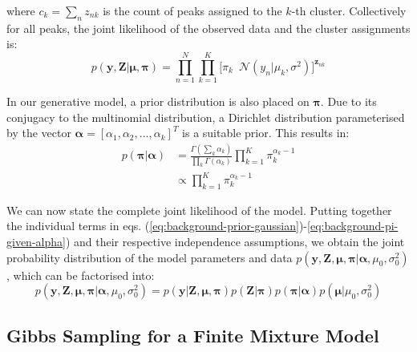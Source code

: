 where $c_{k} = \sum_n z_{nk}$ is the count of peaks assigned to the $k$-th cluster. Collectively for all peaks, the joint likelihood of the observed data and the cluster assignments is:
\begin{equation}
p(\boldsymbol{y},\boldsymbol{Z}  \vert \boldsymbol{\mu},\boldsymbol{\pi}) = \prod_{n=1}^{N} \prod_{k=1}^{K} \big[ \pi_k \enspace \mathcal{N}(y_n \vert \mu_k,\sigma^2) \big]^{\boldsymbol{z}_{nk}}
\label{eq:background-mixture-likelihood}
\end{equation}

In our generative model, a prior distribution is also placed on $\boldsymbol{\pi}$. Due to its conjugacy to the multinomial distribution, a Dirichlet distribution parameterised by the vector $\boldsymbol{\alpha}=[\alpha_1,\alpha_2,...,\alpha_k]^T$ is a suitable prior. This results in:
\begin{equation}
\begin{aligned}
p(\boldsymbol{\pi} \vert \boldsymbol{\alpha}) &= \frac{\Gamma(\sum_{k} \alpha_{k})}{\prod_{k} \Gamma(\alpha_k)}  \prod_{k=1}^{K} \pi_k^{\alpha_{k}-1} \\
                                                                      &\propto \prod_{k=1}^{K} \pi_k^{\alpha_{k}-1}
\end{aligned}
\label{eq:background-pi-given-alpha}
\end{equation}

We can now state the complete joint likelihood of the model. Putting together the individual terms in eqs. (\ref{eq:background-prior-gaussian})-\ref{eq:background-pi-given-alpha}) and their respective independence assumptions, we obtain the joint probability distribution of the model parameters and data $p(\boldsymbol{y}, \boldsymbol{Z}, \boldsymbol{\mu}, \boldsymbol{\pi} \vert \boldsymbol{\alpha}, \allowbreak \mu_0,\sigma_0^2)$, which can be factorised into: 
\begin{equation}
p(\boldsymbol{y}, \boldsymbol{Z}, \boldsymbol{\mu}, \boldsymbol{\pi} \vert \boldsymbol{\alpha},\mu_0,\sigma_0^2) = p(\boldsymbol{y} \vert \boldsymbol{Z}, \boldsymbol{\mu},\boldsymbol{\pi}) p(\boldsymbol{Z} \vert \boldsymbol{\pi}) p(\boldsymbol{\pi} \vert \boldsymbol{\alpha}) p(\boldsymbol{\mu} \vert \mu_0, \sigma_0^2)
\label{eq:example-full-joint-dist}
\end{equation}

\subsection{Gibbs Sampling for a Finite Mixture Model}

